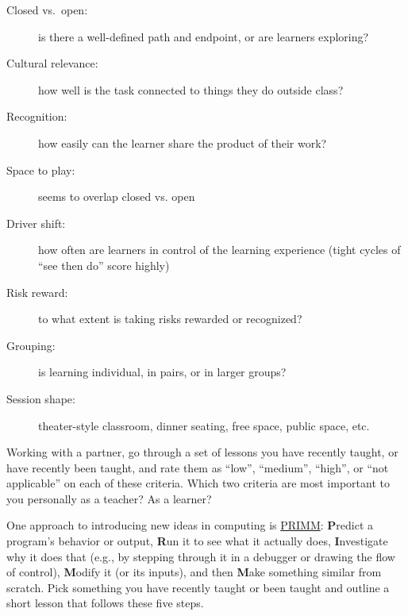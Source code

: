 \begin{description}

  \item[Closed vs.\ open:] is there a well-defined path and endpoint,
    or are learners exploring?

  \item[Cultural relevance:] how well is the task connected to things
    they do outside class?

  \item[Recognition:] how easily can the learner share the product of
    their work?

  \item[Space to play:] seems to overlap closed vs. open

  \item[Driver shift:] how often are learners in control of the
    learning experience (tight cycles of ``see then do'' score highly)

  \item[Risk reward:] to what extent is taking risks rewarded or
    recognized?

  \item[Grouping:] is learning individual, in pairs, or in larger
    groups?

  \item[Session shape:] theater-style classroom, dinner seating, free
    space, public space, etc.

\end{description}

Working with a partner, go through a set of lessons you have recently
taught, or have recently been taught, and rate them as ``low'',
``medium'', ``high'', or ``not applicable'' on each of these criteria.
Which two criteria are most important to you personally as a teacher?
As a learner?


One approach to introducing new ideas in computing is
\href{http://blogs.kcl.ac.uk/cser/2017/09/01/primm-a-structured-approach-to-teaching-programming/}{PRIMM}:
\textbf{P}redict a program's behavior or output, \textbf{R}un it to
see what it actually does, \textbf{I}nvestigate why it does that
(e.g., by stepping through it in a debugger or drawing the flow of
control), \textbf{M}odify it (or its inputs), and then \textbf{M}ake
something similar from scratch.  Pick something you have recently
taught or been taught and outline a short lesson that follows these
five steps.

